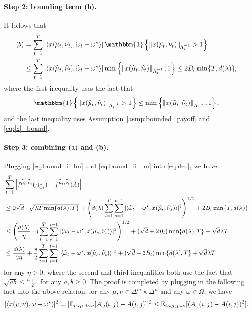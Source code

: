 \paragraph{Step 2: bounding term (b).} It follows that
\begin{align}\label{eq:bound_ii_lm}
    (b) &= \sum_{t=1}^T \left| \langle x(\widehat{\mu}_t,\widehat{\nu}_t),\widehat{\omega}_t-\omega^\star\rangle\right|\mathbbm{1}\left\{\norm{x(\widehat{\mu}_t,\widehat{\nu}_t)}_{\Lambda_{t}^{-1}}> 1\right\} \notag\\
    &\leq \sum_{t=1}^T \left| \langle x(\widehat{\mu}_t,\widehat{\nu}_t),\widehat{\omega}_t-\omega^\star\rangle\right|\min\left\{ \norm{x(\widehat{\mu}_t,\widehat{\nu}_t)}_{\Lambda_{t}^{-1}},1\right\}  \leq 2B_l \min\{T, d(\lambda)\},
\end{align}
where the first inequality uses the fact that
$$\mathbbm{1}\left\{\norm{x(\widehat{\mu}_t,\widehat{\nu}_t)}_{\Lambda_{t}^{-1}}> 1\right\}\leq \min\left\{ \norm{x(\widehat{\mu}_t,\widehat{\nu}_t)}_{\Lambda_{t}^{-1}},1\right\},$$
and the last inequality uses Assumption~\ref{asmp:bounded_payoff} and \eqref{eq:|x|_bound}.

\paragraph{Step 3: combining (a) and (b).} Plugging \eqref{eq:bound_i_lm} and \eqref{eq:bound_ii_lm} into \eqref{eq:dec}, we have
\begin{align}
    & \sum_{t=1}^T \left| f^{\widehat{\mu}_t,\widehat{\nu}_t}(A_{\widehat{\omega}_t}) - f^{\widehat{\mu}_t,\widehat{\nu}_t}(A)\right|\notag\\
    &\leq 2\sqrt{d}\cdot\sqrt{\lambda T \min\{d(\lambda),T\}} + \left(d(\lambda)\sum_{t=1}^T \sum_{s=1}^{t-1} |\langle \widehat{\omega}_t-\omega^\star,x(\widehat{\mu}_s,\widehat{\nu}_s)\rangle|^2\right)^{1/2}+2B_l \min\{T, d(\lambda)\}\notag\\
    &\leq \left(\frac{d(\lambda)}{\eta}\cdot\eta\sum_{t=1}^T \sum_{s=1}^{t-1}  |\langle \widehat{\omega}_t-\omega^\star,x(\widehat{\mu}_s,\widehat{\nu}_s)\rangle|^2\right)^{1/2} + (\sqrt{d}+2B_l) \min\{d(\lambda),T\} +\sqrt{d} \lambda T\notag\\
    &\leq \frac{d(\lambda)}{2\eta} +\frac{\eta}{2}\sum_{t=1}^T \sum_{s=1}^{t-1} |\langle \widehat{\omega}_t-\omega^\star,x(\widehat{\mu}_s,\widehat{\nu}_s)\rangle|^2 + (\sqrt{d}+2B_l) \min\{d(\lambda),T\} +\sqrt{d} \lambda T 
\end{align}
for any $\eta>0$, where the second and third inequalities both use the fact that $\sqrt{ab}\leq \frac{a+b}{2}$ for any $a,b\geq 0$. The proof is completed by plugging in the following fact into the above relation: for any $\mu,\nu\in\Delta^m\times\Delta^n$ and any $\omega\in\Omega$, we have
\begin{align}\label{eq:square_bound}
    |\langle x(\mu,\nu),\omega-\omega^\star\rangle|^2= |\mathbb{E}_{i\sim\mu,j\sim\nu} [A_\omega(i,j)-A(i,j)]|^2\leq \mathbb{E}_{i\sim\mu,j\sim\nu} [(A_\omega(i,j)-A(i,j))^2] .
\end{align} 

